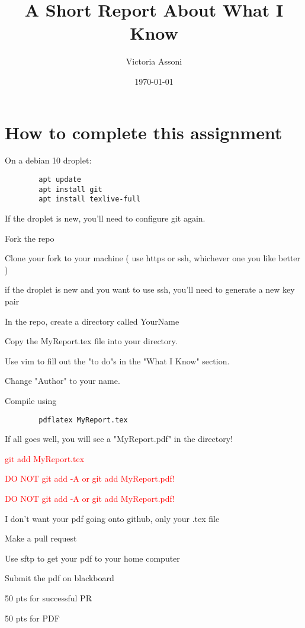 \documentclass[11pt]{article}
\title{A Short Report About What I Know}
\author{ Victoria Assoni }
\date{\today}
\begin{document}
\maketitle	

\section*{How to complete this assignment}
\begin{todolist}
    \item On a debian 10 droplet:
    \begin{verbatim}
        apt update
        apt install git
        apt install texlive-full
    \end{verbatim}
    \item If the droplet is new, you'll need to configure git again.
    \item Fork the repo
    \item Clone your fork to your machine ( use https or ssh, whichever one you like better )
    \item if the droplet is new and you want to use ssh, you'll need to generate a new key pair
    \item In the repo, create a directory called YourName
    \item Copy the MyReport.tex file into your directory.
    \item Use vim to fill out the "to do"s in the "What I Know" section.
    \item Change "Author" to your name.
    \item Compile using
    \begin{verbatim}
        pdflatex MyReport.tex
    \end{verbatim}
    \item If all goes well, you will see a "MyReport.pdf" in the directory!
    \item \textcolor{red}{ git add MyReport.tex}
    \item {\Large\textcolor{red}{ DO NOT git add -A or git add MyReport.pdf!}}
    \item {\LARGE\textcolor{red}{ DO NOT git add -A or git add MyReport.pdf!}}
    \item I don't want your pdf going onto github, only your .tex  file
    \item Make a pull request
    \item Use sftp to get your pdf to your home computer
    \item Submit the pdf on blackboard
    \item 50 pts for successful PR
    \item 50 pts for PDF
\end{todolist}
\end{document}
